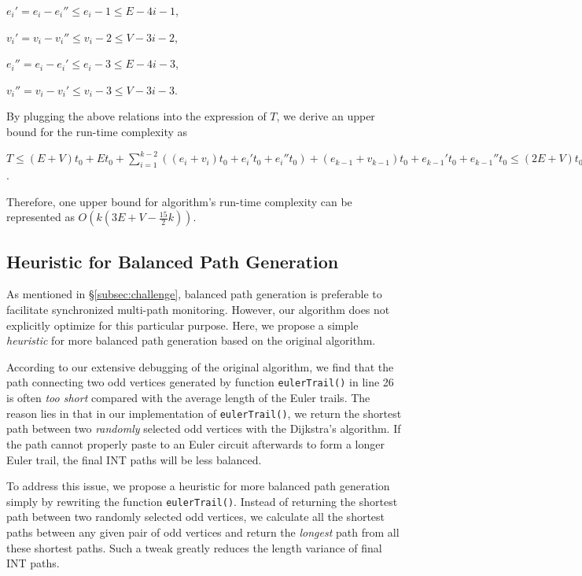 $e_i' = e_i - e_i'' \le e_i - 1 \le E-4i-1$,

$v_i' = v_i - v_i'' \le v_i - 2 \le V-3i-2$,

$e_i'' = e_i - e_i' \le e_i - 3 \le E-4i-3$,

$v_i'' = v_i - v_i' \le v_i - 3 \le V-3i-3$.

By plugging the above relations into the expression of $T$, we derive an upper bound for the run-time complexity as

$T \le (E+V)t_0 + Et_0 + \sum_{i=1}^{k-2}((e_i + v_i)t_0 + e_i't_0 + e_i''t_0) + (e_{k-1} + v_{k-1})t_0 + e_{k-1}'t_0 + e_{k-1}''t_0 \le (2E+V)t_0 + \sum_{i=1}^{k-1}(e_i + v_i + e_i' + e_i'')t_0 \le (2E+V)t_0 + \sum_{i=1}^{k-1}(E-4i + V-3i + E -4i -1 +E -4i -3)t_0 \le (3kE + kV - \frac{15}{2}k^2 -E + \frac{7}{2}k + 4)t_0$.

Therefore, one upper bound for algorithm's run-time complexity can be represented as $O(k(3E + V -\frac{15}{2}k))$.








\subsection{Heuristic for Balanced Path Generation}
\label{subsec:balance}

As mentioned in \S\ref{subsec:challenge}, balanced path generation is preferable to facilitate synchronized multi-path monitoring. However, our algorithm does not explicitly optimize for this particular purpose. Here, we propose a simple \emph{heuristic} for more balanced path generation based on the original algorithm. 

According to our extensive debugging of the original algorithm, we find that the path connecting two odd vertices generated by function \texttt{eulerTrail()} in line 26 is often \emph{too short} compared with the average length of the Euler trails. The reason lies in that in our implementation of \texttt{eulerTrail()}, we return the shortest path between two \emph{randomly} selected odd vertices with the Dijkstra's algorithm. If the path cannot properly paste to an Euler circuit afterwards to form a longer Euler trail, the final INT paths will be less balanced.

To address this issue, we propose a heuristic for more balanced path generation simply by rewriting the function \texttt{eulerTrail()}. Instead of returning the shortest path between two randomly selected odd vertices, we calculate all the shortest paths between any given pair of odd vertices and return the \emph{longest} path from all these shortest paths. Such a tweak greatly reduces the length variance of final INT paths.

